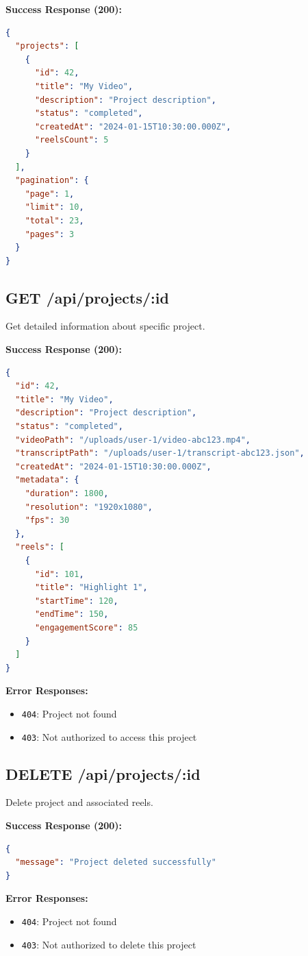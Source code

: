 \textbf{Success Response (200):}
\begin{lstlisting}[language=JSON]
{
  "projects": [
    {
      "id": 42,
      "title": "My Video",
      "description": "Project description",
      "status": "completed",
      "createdAt": "2024-01-15T10:30:00.000Z",
      "reelsCount": 5
    }
  ],
  "pagination": {
    "page": 1,
    "limit": 10,
    "total": 23,
    "pages": 3
  }
}
\end{lstlisting}

\subsection{GET /api/projects/:id}

Get detailed information about specific project.

\textbf{Success Response (200):}
\begin{lstlisting}[language=JSON]
{
  "id": 42,
  "title": "My Video",
  "description": "Project description",
  "status": "completed",
  "videoPath": "/uploads/user-1/video-abc123.mp4",
  "transcriptPath": "/uploads/user-1/transcript-abc123.json",
  "createdAt": "2024-01-15T10:30:00.000Z",
  "metadata": {
    "duration": 1800,
    "resolution": "1920x1080",
    "fps": 30
  },
  "reels": [
    {
      "id": 101,
      "title": "Highlight 1",
      "startTime": 120,
      "endTime": 150,
      "engagementScore": 85
    }
  ]
}
\end{lstlisting}

\textbf{Error Responses:}
\begin{itemize}
    \item \texttt{404}: Project not found
    \item \texttt{403}: Not authorized to access this project
\end{itemize}

\subsection{DELETE /api/projects/:id}

Delete project and associated reels.

\textbf{Success Response (200):}
\begin{lstlisting}[language=JSON]
{
  "message": "Project deleted successfully"
}
\end{lstlisting}

\textbf{Error Responses:}
\begin{itemize}
    \item \texttt{404}: Project not found
    \item \texttt{403}: Not authorized to delete this project
\end{itemize}

